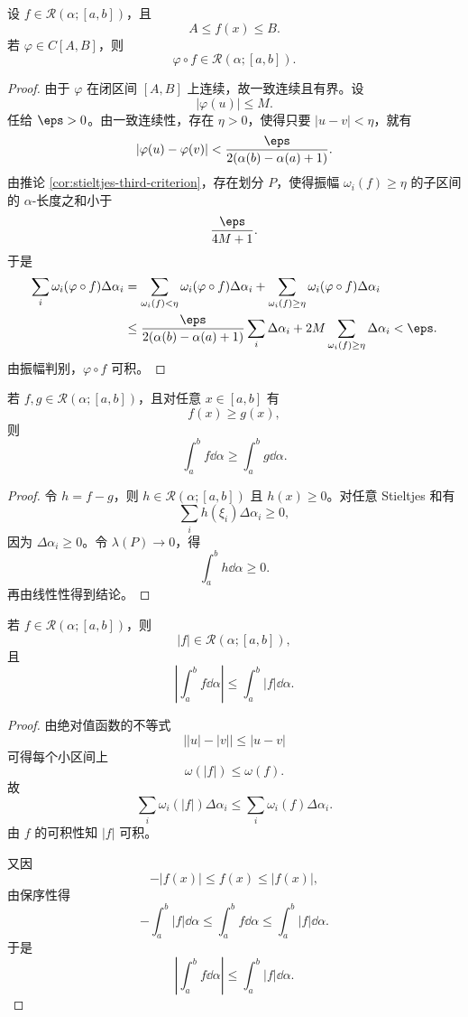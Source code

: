 \begin{proposition}\label{prop:composition-stieltjes}
	设 $f\in\mathcal R(\alpha;[a,b])$，且
	\[
	A\leq f(x)\leq B.
	\]
	若 $\varphi\in C[A,B]$，则
	\[
	\varphi\circ f\in\mathcal R(\alpha;[a,b]).
	\]
\end{proposition}

\begin{proof}
	由于 $\varphi$ 在闭区间 $[A,B]$ 上连续，故一致连续且有界。设
	\[
	|\varphi(u)|\leq M.
	\]
	任给 $\eps>0$。由一致连续性，存在 $\eta>0$，使得只要 $|u-v|<\eta$，就有
	\[
	|\varphi(u)-\varphi(v)|<\frac{\eps}{2(\alpha(b)-\alpha(a)+1)}.
	\]
	由推论 \ref{cor:stieltjes-third-criterion}，存在划分 $P$，使得振幅 $\omega_i(f)\geq\eta$ 的子区间的 $\alpha$-长度之和小于
	\[
	\frac{\eps}{4M+1}.
	\]
	于是
	\[
	\begin{aligned}
		\sum_i\omega_i(\varphi\circ f)\Delta\alpha_i
		&=\sum_{\omega_i(f)<\eta}\omega_i(\varphi\circ f)\Delta\alpha_i
		+\sum_{\omega_i(f)\geq\eta}\omega_i(\varphi\circ f)\Delta\alpha_i \\
		&\leq \frac{\eps}{2(\alpha(b)-\alpha(a)+1)}\sum_i\Delta\alpha_i
		+2M\sum_{\omega_i(f)\geq\eta}\Delta\alpha_i
		<\eps.
	\end{aligned}
	\]
	由振幅判别，$\varphi\circ f$ 可积。
\end{proof}

\begin{proposition}\label{prop:monotonicity-stieltjes}
	若 $f,g\in\mathcal R(\alpha;[a,b])$，且对任意 $x\in[a,b]$ 有
	\[
	f(x)\geq g(x),
	\]
	则
	\[
	\int_a^b f\dd\alpha\geq \int_a^b g\dd\alpha.
	\]
\end{proposition}

\begin{proof}
	令 $h=f-g$，则 $h\in\mathcal R(\alpha;[a,b])$ 且 $h(x)\geq0$。对任意 Stieltjes 和有
	\[
	\sum_i h(\xi_i)\Delta\alpha_i\geq0,
	\]
	因为 $\Delta\alpha_i\geq0$。令 $\lambda(P)\to0$，得
	\[
	\int_a^b h\dd\alpha\geq0.
	\]
	再由线性性得到结论。
\end{proof}

\begin{proposition}\label{prop:absolute-value-stieltjes}
	若 $f\in\mathcal R(\alpha;[a,b])$，则
	\[
	|f|\in\mathcal R(\alpha;[a,b]),
	\]
	且
	\[
	\left|\int_a^b f\dd\alpha\right|
	\leq \int_a^b |f|\dd\alpha.
	\]
\end{proposition}

\begin{proof}
	由绝对值函数的不等式
	\[
	\bigl||u|-|v|\bigr|\leq |u-v|
	\]
	可得每个小区间上
	\[
	\omega(|f|)\leq\omega(f).
	\]
	故
	\[
	\sum_i\omega_i(|f|)\Delta\alpha_i
	\leq\sum_i\omega_i(f)\Delta\alpha_i.
	\]
	由 $f$ 的可积性知 $|f|$ 可积。
	
	又因
	\[
	-|f(x)|\leq f(x)\leq |f(x)|,
	\]
	由保序性得
	\[
	-\int_a^b |f|\dd\alpha
	\leq \int_a^b f\dd\alpha
	\leq \int_a^b |f|\dd\alpha.
	\]
	于是
	\[
	\left|\int_a^b f\dd\alpha\right|
	\leq \int_a^b |f|\dd\alpha.
	\]
\end{proof}

